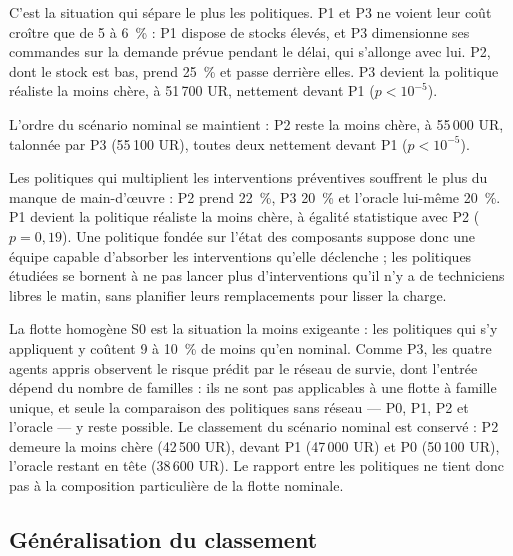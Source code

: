 C'est la situation qui sépare le plus les politiques. P1 et P3 ne voient leur coût croître que de 5 à 6~\% : P1 dispose de stocks élevés, et P3 dimensionne ses commandes sur la demande prévue pendant le délai, qui s'allonge avec lui. P2, dont le stock est bas, prend 25~\% et passe derrière elles. P3 devient la politique réaliste la moins chère, à 51\,700 UR, nettement devant P1 ($p < 10^{-5}$).

L'ordre du scénario nominal se maintient : P2 reste la moins chère, à 55\,000 UR, talonnée par P3 (55\,100 UR), toutes deux nettement devant P1 ($p < 10^{-5}$).

Les politiques qui multiplient les interventions préventives souffrent le plus du manque de main-d'œuvre : P2 prend 22~\%, P3 20~\% et l'oracle lui-même 20~\%. P1 devient la politique réaliste la moins chère, à égalité statistique avec P2 ($p = 0{,}19$). Une politique fondée sur l'état des composants suppose donc une équipe capable d'absorber les interventions qu'elle déclenche ; les politiques étudiées se bornent à ne pas lancer plus d'interventions qu'il n'y a de techniciens libres le matin, sans planifier leurs remplacements pour lisser la charge.

La flotte homogène S0 est la situation la moins exigeante : les politiques qui s'y appliquent y coûtent 9 à 10~\% de moins qu'en nominal. Comme P3, les quatre agents appris observent le risque prédit par le réseau de survie, dont l'entrée dépend du nombre de familles : ils ne sont pas applicables à une flotte à famille unique, et seule la comparaison des politiques sans réseau — P0, P1, P2 et l'oracle — y reste possible. Le classement du scénario nominal est conservé : P2 demeure la moins chère (42\,500 UR), devant P1 (47\,000 UR) et P0 (50\,100 UR), l'oracle restant en tête (38\,600 UR). Le rapport entre les politiques ne tient donc pas à la composition particulière de la flotte nominale.

\subsection{Généralisation du classement}

